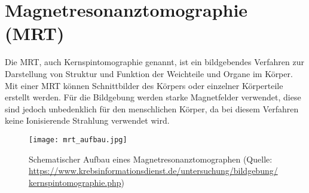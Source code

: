 \section{Magnetresonanztomographie (MRT)}
Die \ac{MRT}, auch Kernspintomographie genannt, ist ein bildgebendes Verfahren zur Darstellung von Struktur und Funktion der Weichteile und Organe im Körper. Mit einer \ac{MRT} können Schnittbilder des Körpers oder einzelner Körperteile erstellt werden. Für die Bildgebung werden starke Magnetfelder verwendet, diese sind jedoch unbedenklich für den menschlichen Körper, da bei diesem Verfahren keine \gls{Ionisierende Strahlung} verwendet wird. \cite[vgl.][]{Kramme2016}\\
\begin{figure}[ht]
	\centering
	\texttt{[image: mrt\_aufbau.jpg]}
	\caption{Schematischer Aufbau eines Magnetresonanztomographen (Quelle: \url{https://www.krebsinformationsdienst.de/untersuchung/bildgebung/kernspintomographie.php})}
\end{figure}

